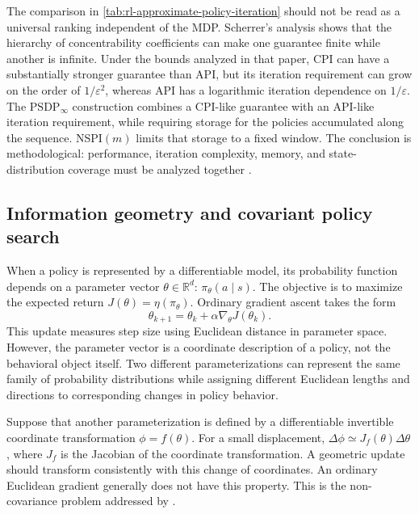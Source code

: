 The comparison in \cref{tab:rl-approximate-policy-iteration} should not be read
as a universal ranking independent of the MDP. Scherrer's analysis shows that
the hierarchy of concentrability coefficients can make one guarantee finite
while another is infinite. Under the bounds analyzed in that paper, CPI can
have a substantially stronger guarantee than API, but its iteration requirement
can grow on the order of $1/\varepsilon^2$, whereas API has a logarithmic
iteration dependence on $1/\varepsilon$. The $\mathrm{PSDP}_\infty$ construction
combines a CPI-like guarantee with an API-like iteration requirement, while
requiring storage for the policies accumulated along the sequence. NSPI$(m)$
limits that storage to a fixed window. The conclusion is methodological:
performance, iteration complexity, memory, and state-distribution coverage must
be analyzed together \parencite{scherrer2014approximate}.

\subsection{Information geometry and covariant policy search}
\label{subsec:rl-information-geometry}

When a policy is represented by a differentiable model, its probability
function depends on a parameter vector $\theta\in\mathbb{R}^d$:
$\pi_\theta(a\mid s)$. The objective is to maximize the expected return
$J(\theta)=\eta(\pi_\theta)$. Ordinary gradient ascent takes the form
\begin{equation}
    \theta_{k+1}
    =\theta_k+\alpha\nabla_\theta J(\theta_k).
    \label{eq:rl-euclidean-gradient}
\end{equation}
This update measures step size using Euclidean distance in parameter space.
However, the parameter vector is a coordinate description of a policy, not the
behavioral object itself. Two different parameterizations can represent the
same family of probability distributions while assigning different Euclidean
lengths and directions to corresponding changes in policy behavior.

Suppose that another parameterization is defined by a differentiable invertible
coordinate transformation $\phi=f(\theta)$. For a small displacement,
$\Delta\phi\simeq J_f(\theta)\Delta\theta$, where $J_f$ is the Jacobian of the
coordinate transformation. A geometric update should transform consistently
with this change of coordinates. An ordinary Euclidean gradient generally does
not have this property. This is the non-covariance problem addressed by
\textcite{bagnell2003covariant}.


